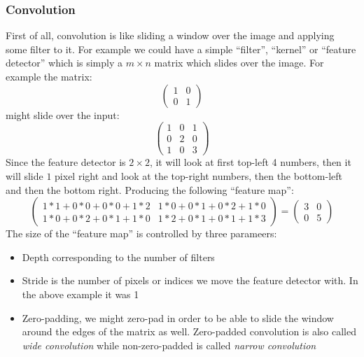     \subsubsection{Convolution}
    First of all, convolution is like sliding a window over the image and 
    applying some filter to it. For example we could have a simple ``filter'', 
    ``kernel'' or ``feature detector'' which is simply a $m\times n$ matrix 
    which slides over the image. For example the matrix:
    \begin{equation*}
        \begin{pmatrix}
        1 & 0\\
        0 & 1
        \end{pmatrix}
    \end{equation*}
    might slide over the input:
    \begin{equation*}
        \begin{pmatrix}
        1 & 0 & 1\\
        0 & 2 & 0\\
        1 & 0 & 3
        \end{pmatrix}
    \end{equation*}
    Since the feature detector is $2\times 2$, it will look at first top-left 4 
    numbers, then it will slide $1$ pixel right and look at the top-right 
    numbers, then the bottom-left and then the bottom right. Producing the 
    following ``feature map'':
    \begin{equation*}
        \begin{pmatrix}
        1*1 + 0*0 + 0*0 + 1*2 & 1*0 + 0*1 + 0*2 + 1*0\\
        1*0 + 0*2 + 0*1 + 1*0 & 1*2 + 0*1 + 0*1 + 1*3 
        \end{pmatrix} = \begin{pmatrix}
        3 & 0\\
        0 & 5
        \end{pmatrix}
    \end{equation*}
    The size of the ``feature map'' is controlled by three parameers:
    \begin{itemize}
        \item Depth corresponding to the number of filters
        \item Stride is the number of pixels or indices we move the feature 
        detector with. In the above example it was 1
        \item Zero-padding, we might zero-pad in order to be able to slide the 
        window around the  edges of the matrix as well. Zero-padded convolution 
        is also called \textit{wide convolution} while non-zero-padded is 
        called \textit{narrow convolution}
    \end{itemize}
    

